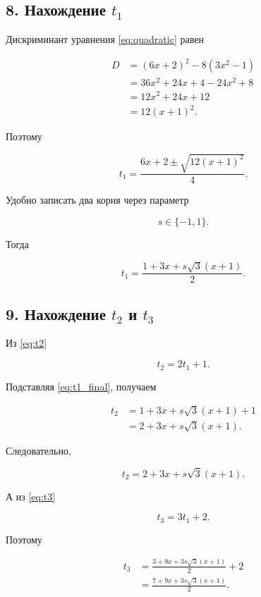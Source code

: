 \documentclass[a4paper,12pt]{article}
\begin{document}
	\subsection*{8. Нахождение $t_1$}
	
	Дискриминант уравнения \eqref{eq:quadratic} равен
	
	\begin{align*}
		D
		&=
		(6x+2)^2
		-
		8(3x^2-1)
		\\
		&=
		36x^2+24x+4
		-24x^2+8
		\\
		&=
		12x^2+24x+12
		\\
		&=
		12(x+1)^2.
	\end{align*}
	
	Поэтому
	
	\[
	t_1
	=
	\frac{6x+2\pm\sqrt{12(x+1)^2}}{4}.
	\]
	
	Удобно записать два корня через параметр
	
	\[
	s\in\{-1,1\}.
	\]
	
	Тогда
	
	\begin{equation}
		\boxed{
			t_1
			=
			\frac{1+3x+s\sqrt3(x+1)}{2}.
		}
		\label{eq:t1_final}
	\end{equation}
	
	\subsection*{9. Нахождение $t_2$ и $t_3$}
	
	Из \eqref{eq:t2}
	
	\[
	t_2=2t_1+1.
	\]
	
	Подставляя \eqref{eq:t1_final}, получаем
	
	\begin{align*}
		t_2
		&=
		1+3x+s\sqrt3(x+1)+1
		\\
		&=
		2+3x+s\sqrt3(x+1).
	\end{align*}
	
	Следовательно,
	
	\begin{equation}
		\boxed{
			t_2
			=
			2+3x+s\sqrt3(x+1).
		}
		\label{eq:t2_final}
	\end{equation}
	
	А из \eqref{eq:t3}
	
	\[
	t_3=3t_1+2.
	\]
	
	Поэтому
	
	\begin{align*}
		t_3
		&=
		\frac{3+9x+3s\sqrt3(x+1)}{2}+2
		\\
		&=
		\frac{
			7+9x+3s\sqrt3(x+1)
		}{2}.
	\end{align*}
	
\end{document}
